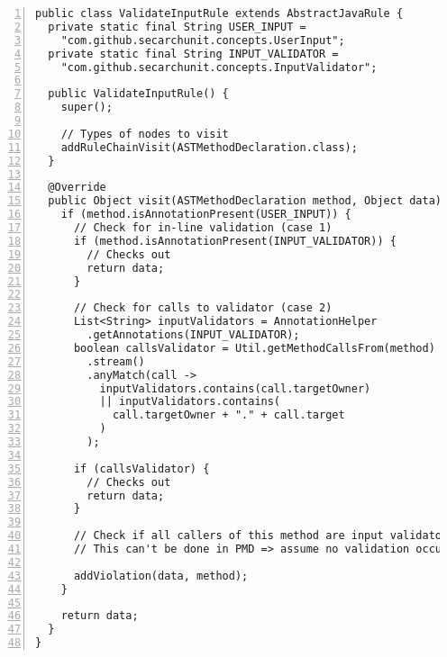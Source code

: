 \begin{lstlisting}[caption={Constraint 4.}, captionpos=b, label=lst:pmd_4, numbers=left, showstringspaces=false]
public class ValidateInputRule extends AbstractJavaRule {
  private static final String USER_INPUT =
    "com.github.secarchunit.concepts.UserInput";
  private static final String INPUT_VALIDATOR =
    "com.github.secarchunit.concepts.InputValidator";

  public ValidateInputRule() {
    super();

    // Types of nodes to visit
    addRuleChainVisit(ASTMethodDeclaration.class);
  }

  @Override
  public Object visit(ASTMethodDeclaration method, Object data) {
    if (method.isAnnotationPresent(USER_INPUT)) {
      // Check for in-line validation (case 1)
      if (method.isAnnotationPresent(INPUT_VALIDATOR)) {
        // Checks out
        return data;
      }

      // Check for calls to validator (case 2)
      List<String> inputValidators = AnnotationHelper
        .getAnnotations(INPUT_VALIDATOR);
      boolean callsValidator = Util.getMethodCallsFrom(method)
        .stream()
        .anyMatch(call ->
          inputValidators.contains(call.targetOwner)
          || inputValidators.contains(
            call.targetOwner + "." + call.target
          )
        );

      if (callsValidator) {
        // Checks out
        return data;
      }

      // Check if all callers of this method are input validators (case 3)
      // This can't be done in PMD => assume no validation occurs

      addViolation(data, method);
    }

    return data;
  }
}

\end{lstlisting}


